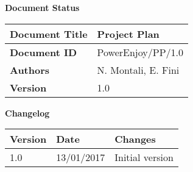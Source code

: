 \textbf{\Huge Document Status}
\begin{center}
    \begin{tabular}{ | l | p{10cm} |}
    \hline
    \textbf{Document Title} & Project Plan \\ \hline
    \textbf{Document ID} & PowerEnjoy/PP/1.0 \\ \hline
    \textbf{Authors} & N. Montali, E. Fini \\ \hline
    \textbf{Version} & 1.0 \\ \hline
    \end{tabular}
\textbf{\Large Changelog}
     \begin{tabular}{ | l | l | p{10cm} |}
    \hline
    \textbf{Version} & \textbf{Date} & \textbf{Changes} \\ \hline
    1.0 & 13/01/2017 & Initial version \\ \hline
    \end{tabular}
\end{center}